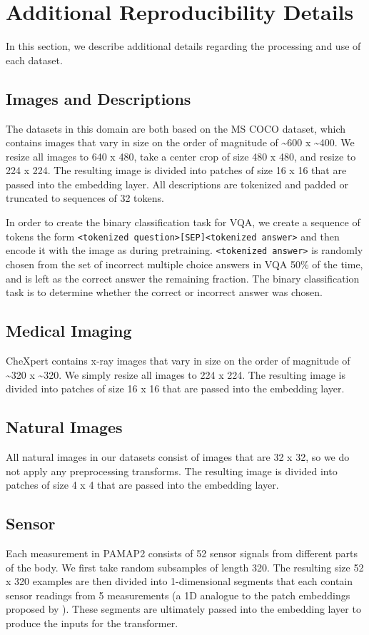 \documentclass{article}
\begin{document}
\section{Additional Reproducibility Details}
\label{sec:repro}
In this section, we describe additional details regarding the processing and use of each dataset.

\subsection{Images and Descriptions}
The datasets in this domain are both based on the MS COCO dataset, which contains images that vary in size on the order of magnitude of \textasciitilde{600} x \textasciitilde{400}. We resize all images to 640 x 480, take a center crop of size 480 x 480, and resize to 224 x 224. The resulting image is divided into patches of size 16 x 16 that are passed into the embedding layer. All descriptions are tokenized and padded or truncated to sequences of 32 tokens.

In order to create the binary classification task for VQA, we create a sequence of tokens the form \texttt{<tokenized question>[SEP]<tokenized answer>} and then encode it with the image as during pretraining. \texttt{<tokenized answer>} is randomly chosen from the set of incorrect multiple choice answers in VQA 50\% of the time, and is left as the correct answer the remaining fraction. The binary classification task is to determine whether the correct or incorrect answer was chosen.  

\subsection{Medical Imaging}
CheXpert contains x-ray images that vary in size on the order of magnitude of \textasciitilde{320} x \textasciitilde{320}. We simply resize all images to 224 x 224. The resulting image is divided into patches of size 16 x 16 that are passed into the embedding layer.

\subsection{Natural Images}
All natural images in our datasets consist of images that are 32 x 32, so we do not apply any preprocessing transforms. The resulting image is divided into patches of size 4 x 4 that are passed into the embedding layer.

\subsection{Sensor}
Each measurement in PAMAP2 consists of 52 sensor signals from different parts of the body. We first take random subsamples of length 320. The resulting size 52 x 320 examples are then divided into 1-dimensional segments that each contain sensor readings from 5 measurements (a 1D analogue to the patch embeddings proposed by \citep{Dosovitskiy2020AnII}). These segments are ultimately passed into the embedding layer to produce the inputs for the transformer.
\end{document}
